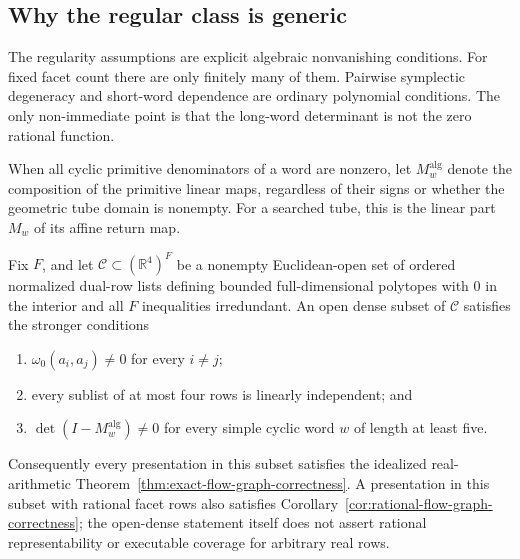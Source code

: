 \subsection{Why the regular class is generic}
\label{subsec:flow-graph-algorithm-ch2021-genericity}

The regularity assumptions are explicit algebraic nonvanishing conditions.
For fixed facet count there are only finitely many of them.  Pairwise
symplectic degeneracy and short-word dependence are ordinary polynomial
conditions.  The only non-immediate point is that the long-word determinant is
not the zero rational function.

When all cyclic primitive denominators of a word are nonzero, let
\(M_w^{\mathrm{alg}}\) denote the composition of the primitive linear maps,
regardless of their signs or whether the geometric tube domain is nonempty.
For a searched tube, this is the linear part \(M_w\) of its affine return map.

\begin{proposition}
\label{prop:flow-graph-presentation-chamber-genericity}
Fix \(F\), and let \(\mathcal C\subset(\mathbb R^4)^F\) be a nonempty
Euclidean-open set of ordered normalized dual-row lists defining bounded
full-dimensional polytopes with \(0\) in the interior and all \(F\)
inequalities irredundant.  An open dense subset of \(\mathcal C\) satisfies
the stronger conditions
\begin{enumerate}
  \item \(\omega_0(a_i,a_j)\ne0\) for every \(i\ne j\);
  \item every sublist of at most four rows is linearly independent; and
  \item \(\det(I-M_w^{\mathrm{alg}})\ne0\) for every simple cyclic word \(w\)
    of length at least five.
\end{enumerate}
Consequently every presentation in this subset satisfies the idealized
real-arithmetic Theorem~\ref{thm:exact-flow-graph-correctness}.  A presentation
in this subset with rational facet rows also satisfies
Corollary~\ref{cor:rational-flow-graph-correctness}; the open-dense statement
itself does not assert rational representability or executable coverage for
arbitrary real rows.
\end{proposition}

